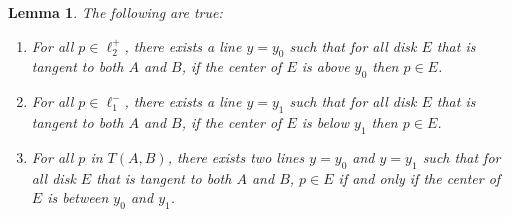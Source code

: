 \documentclass[pdftex,leqno,fleqn,12pt]{article}
\newtheorem{lemma}[theorem]{Lemma}
\begin{document}
\begin{lemma}\label{lemma-containment} The following are true:
\begin{enumerate}
\item For all $p\in\ell_2^+$, there exists a line $y=y_0$ such that for all disk $E$ that is tangent to both $A$ and
$B$, if the center of $E$ is above $y_0$ then $p\in E$.
\item For all $p\in\ell_1^-$, there exists a line $y=y_1$ such that for all disk $E$ that is tangent to both $A$ and
$B$, if the center of $E$ is below $y_1$ then $p\in E$.
\item For all $p$ in $T(A,B)$, there exists two lines $y=y_0$ and $y=y_1$ such that for all disk $E$ that is tangent to both $A$ and
$B$, $p\in E$ if and only if the center of $E$ is between $y_0$ and $y_1$.
\end{enumerate}
\end{lemma}
\end{document}
